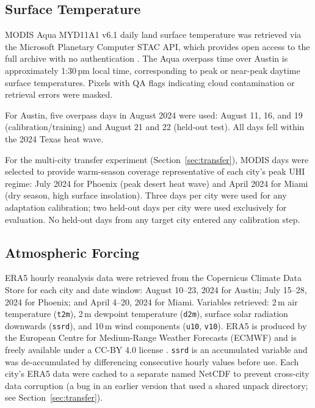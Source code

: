 \documentclass[12pt, letterpaper]{article}
\begin{document}
\subsection{Surface Temperature}
MODIS Aqua MYD11A1 v6.1 daily land surface temperature was retrieved via
the Microsoft Planetary Computer STAC API, which provides open access to
the full archive with no authentication \citep{microsoft_pc}. The Aqua
overpass time over Austin is approximately 1:30\,pm local time, corresponding
to peak or near-peak daytime surface temperatures. Pixels with QA flags
indicating cloud contamination or retrieval errors were masked.

For Austin, five overpass days in August 2024 were used: August 11, 16, and 19
(calibration/training) and August 21 and 22 (held-out test). All days fell
within the 2024 Texas heat wave.

For the multi-city transfer experiment (Section~\ref{sec:transfer}), MODIS
days were selected to provide warm-season coverage representative of each
city's peak UHI regime: July 2024 for Phoenix (peak desert heat wave) and
April 2024 for Miami (dry season, high surface insolation). Three days
per city were used for any adaptation calibration; two held-out days per city
were used exclusively for evaluation. No held-out days from any target city
entered any calibration step.

\subsection{Atmospheric Forcing}
ERA5 hourly reanalysis data were retrieved from the Copernicus Climate Data
Store for each city and date window: August 10--23, 2024 for Austin;
July 15--28, 2024 for Phoenix; and April 4--20, 2024 for Miami. Variables
retrieved: 2\,m air temperature (\texttt{t2m}), 2\,m dewpoint temperature
(\texttt{d2m}), surface solar radiation downwards (\texttt{ssrd}), and 10\,m
wind components (\texttt{u10}, \texttt{v10}). ERA5 is produced by the
European Centre for Medium-Range Weather Forecasts (ECMWF) and is freely
available under a CC-BY 4.0 license \citep{hersbach2020era5}. \texttt{ssrd}
is an accumulated variable and was de-accumulated by differencing consecutive
hourly values before use. Each city's ERA5 data were cached to a separate
named NetCDF to prevent cross-city data corruption (a bug in an earlier version
that used a shared unpack directory; see Section~\ref{sec:transfer}).

\end{document}
